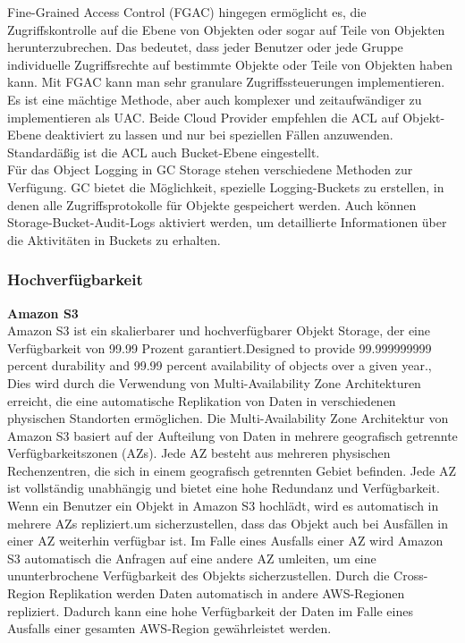 Fine-Grained Access Control (FGAC) hingegen ermöglicht es, die Zugriffskontrolle auf die Ebene von Objekten oder sogar auf Teile von Objekten herunterzubrechen. Das bedeutet, dass jeder Benutzer oder jede Gruppe individuelle Zugriffsrechte auf bestimmte Objekte oder Teile von Objekten haben kann. Mit FGAC kann man sehr granulare Zugriffssteuerungen implementieren. Es ist eine mächtige Methode, aber auch komplexer und zeitaufwändiger zu implementieren als UAC. Beide Cloud Provider empfehlen die ACL auf Objekt-Ebene deaktiviert zu lassen und nur bei speziellen Fällen anzuwenden. Standardäßig ist die ACL auch Bucket-Ebene eingestellt.\\

Für das Object Logging in GC Storage stehen verschiedene Methoden zur Verfügung. GC bietet die Möglichkeit, spezielle Logging-Buckets zu erstellen, in denen alle Zugriffsprotokolle für Objekte gespeichert werden. Auch können Storage-Bucket-Audit-Logs aktiviert werden, um detaillierte Informationen über die Aktivitäten in Buckets zu erhalten.

\newpage

\subsubsection{Hochverfügbarkeit}

\textbf{Amazon S3}\\

Amazon S3 ist ein skalierbarer und hochverfügbarer Objekt Storage, der eine Verfügbarkeit von 99.99 Prozent garantiert.\glqq Designed to provide 99.999999999 percent durability and 99.99 percent availability of objects over a given year.\grqq, \cite{aws-availability}\\

Dies wird durch die Verwendung von Multi-Availability Zone Architekturen erreicht, die eine automatische Replikation von Daten in verschiedenen physischen Standorten ermöglichen. Die Multi-Availability Zone Architektur von Amazon S3 basiert auf der Aufteilung von Daten in mehrere geografisch getrennte Verfügbarkeitszonen (AZs). Jede AZ besteht aus mehreren physischen Rechenzentren, die sich in einem geografisch getrennten Gebiet befinden. Jede AZ ist vollständig unabhängig und bietet eine hohe Redundanz und Verfügbarkeit. Wenn ein Benutzer ein Objekt in Amazon S3 hochlädt, wird es automatisch in mehrere AZs repliziert.um sicherzustellen, dass das Objekt auch bei Ausfällen in einer AZ weiterhin verfügbar ist. Im Falle eines Ausfalls einer AZ wird Amazon S3 automatisch die Anfragen auf eine andere AZ umleiten, um eine ununterbrochene Verfügbarkeit des Objekts sicherzustellen. Durch die Cross-Region Replikation werden Daten automatisch in andere AWS-Regionen repliziert. Dadurch kann eine hohe Verfügbarkeit der Daten im Falle eines Ausfalls einer gesamten AWS-Region gewährleistet werden.\\

